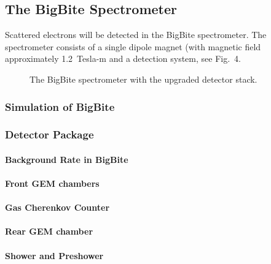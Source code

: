 \subsection{The BigBite Spectrometer}
%
\label{sec:expsetup_bigbite}             
%
Scattered electrons will be detected in the BigBite spectrometer.
The spectrometer consists of a single dipole magnet (with magnetic field approximately 1.2~Tesla-m 
and a detection system, see Fig.~4.  

\begin{figure}[htbp]
\begin{center}
\end{center}
\caption{The BigBite spectrometer with the upgraded detector stack.}
\label{fig:BB}
\end{figure} 

\subsubsection{Simulation of BigBite}

\subsubsection{Detector Package}

\paragraph{Background Rate in BigBite}

\paragraph{Front GEM chambers}

\paragraph{Gas Cherenkov Counter}

\paragraph{Rear GEM chamber}

\paragraph{Shower and Preshower}

